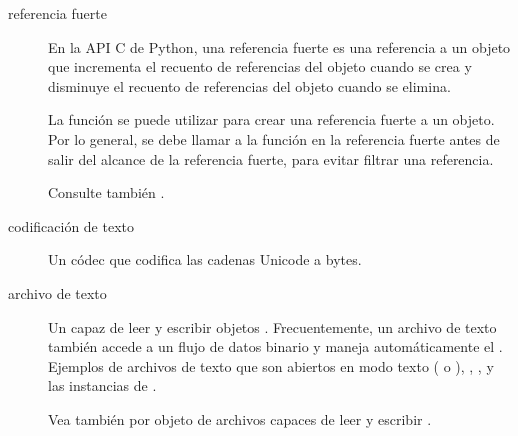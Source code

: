 \documentclass[a4,10pt,spanish]{sphinxmanual}
\begin{document}
\begin{description}
\item[{referencia fuerte\label{\detokenize{glossary:term-strong-reference}}}] \leavevmode
\sphinxAtStartPar
En la API C de Python, una referencia fuerte es una referencia a un objeto que incrementa el recuento de referencias del objeto cuando se crea y disminuye el recuento de referencias del objeto cuando se elimina.

\sphinxAtStartPar
La función  se puede utilizar para crear una referencia fuerte a un objeto. Por lo general, se debe llamar a la función  en la referencia fuerte antes de salir del alcance de la referencia fuerte, para evitar filtrar una referencia.

\sphinxAtStartPar
Consulte también {\hyperref[\detokenize{glossary:term-borrowed-reference}]{}}.

\item[{codificación de texto\label{\detokenize{glossary:term-text-encoding}}}] \leavevmode
\sphinxAtStartPar
Un códec que codifica las cadenas Unicode a bytes.

\item[{archivo de texto\label{\detokenize{glossary:term-text-file}}}] \leavevmode
\sphinxAtStartPar
Un {\hyperref[\detokenize{glossary:term-file-object}]{}} capaz de leer y escribir objetos . Frecuentemente, un archivo de texto también accede a un flujo de datos binario y maneja automáticamente el {\hyperref[\detokenize{glossary:term-text-encoding}]{}}. Ejemplos de archivos de texto que son abiertos en modo texto ( o ), , , y las instancias de .

\sphinxAtStartPar
Vea también {\hyperref[\detokenize{glossary:term-binary-file}]{}} por objeto de archivos capaces de leer y escribir {\hyperref[\detokenize{glossary:term-bytes-like-object}]{}}.


\end{description}
\end{document}
